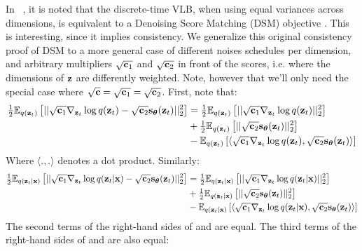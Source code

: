 \documentclass{article}
\begin{document}
In ~\citep{ho2020denoising}, it is noted that the discrete-time VLB, when using equal variances across dimensions, is equivalent to a Denoising Score Matching (DSM) objective \citep{vincent2011connection}. This is interesting, since it implies consistency. We generalize this original consistency proof of DSM to a more general case of different noises schedules per dimension, and arbitrary multipliers $\sqrt{{\mathbf{c}}_1}$ and $\sqrt{{\mathbf{c}}_2}$ in front of the scores, i.e. where the dimensions of ${\mathbf{z}}$ are differently weighted. Note, however that we'll only need the special case where $\sqrt{{\mathbf{c}}}=\sqrt{{\mathbf{c}}_1}=\sqrt{{\mathbf{c}}_2}$. 
First, note that:
\begin{align}
\tfrac{1}{2} \mathbb{E}_{q({\mathbf{z}}_t)} \left[ ||\sqrt{{\mathbf{c}}_1}\nabla_{{\mathbf{z}}_t} \log q({\mathbf{z}}_t) - \sqrt{{\mathbf{c}}_2}\mathbf{s}_{{\boldsymbol{\theta}}}({\mathbf{z}}_t)||_2^2 \right]
&= \tfrac{1}{2} \mathbb{E}_{q({\mathbf{z}}_t)} \left[ ||\sqrt{{\mathbf{c}}_1}\nabla_{{\mathbf{z}}_t} \log q({\mathbf{z}}_t)||_2^2 \right]
\nonumber\\
&+ \tfrac{1}{2} \mathbb{E}_{q({\mathbf{z}}_t)} \left[ ||\sqrt{{\mathbf{c}}_2}\mathbf{s}_{{\boldsymbol{\theta}}}({\mathbf{z}}_t)||_2^2 \right]
\nonumber\\
&- \mathbb{E}_{q({\mathbf{z}}_t)} \left[ \langle \sqrt{{\mathbf{c}}_1} \nabla_{{\mathbf{z}}_t} \log q({\mathbf{z}}_t), \sqrt{{\mathbf{c}}_2}\mathbf{s}_{{\boldsymbol{\theta}}}({\mathbf{z}}_t) \rangle \right]
\label{eq:dsm_a}
\end{align}
Where $\langle ., . \rangle$ denotes a dot product. Similarly:
\begin{align}
\tfrac{1}{2} \mathbb{E}_{q({\mathbf{z}}_t|{\mathbf{x}})} \left[ ||\sqrt{{\mathbf{c}}_1}\nabla_{{\mathbf{z}}_t} \log q({\mathbf{z}}_t|{\mathbf{x}}) - \sqrt{{\mathbf{c}}_2}\mathbf{s}_{{\boldsymbol{\theta}}}({\mathbf{z}}_t)||_2^2 \right]
&= \tfrac{1}{2} \mathbb{E}_{q({\mathbf{z}}_t|{\mathbf{x}})} \left[ ||\sqrt{{\mathbf{c}}_1}\nabla_{{\mathbf{z}}_t} \log q({\mathbf{z}}_t|{\mathbf{x}})||_2^2 \right]
\nonumber\\
&+ \tfrac{1}{2} \mathbb{E}_{q({\mathbf{z}}_t|{\mathbf{x}})} \left[ ||\sqrt{{\mathbf{c}}_2}\mathbf{s}_{{\boldsymbol{\theta}}}({\mathbf{z}}_t)||_2^2 \right]
\nonumber\\
&- \mathbb{E}_{q({\mathbf{z}}_t|{\mathbf{x}})} \left[ \langle \sqrt{{\mathbf{c}}_1}\nabla_{{\mathbf{z}}_t} \log q({\mathbf{z}}_t|{\mathbf{x}}), \sqrt{{\mathbf{c}}_2}\mathbf{s}_{{\boldsymbol{\theta}}}({\mathbf{z}}_t) \rangle \right]
\label{eq:dsm_b}
\end{align}
The second terms of the right-hand sides of  and  are equal. The third terms of the right-hand sides of  and  are also equal:
\end{document}
